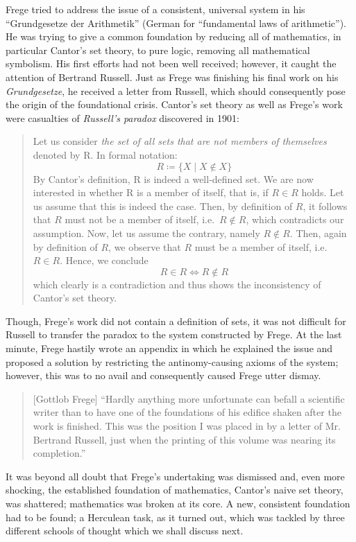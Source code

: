 \documentclass[hidelinks]{article}
\begin{document}
Frege tried to address the issue of a consistent, universal system in his ``Grundgesetze der Arithmetik'' (German for ``fundamental laws of arithmetic''). He was trying to give a common foundation by reducing all of mathematics, in particular Cantor's set theory, to pure logic, removing all mathematical symbolism. His first efforts had not been well received; however, it caught the attention of Bertrand Russell. Just as Frege was finishing his final work on his \textit{Grundgesetze}, he received a letter from Russell, which should consequently pose the origin of the foundational crisis. Cantor's set theory as well as Frege's work were casualties of \textit{Russell's paradox} discovered in 1901:
\begin{quote}
Let us consider \textit{the set of all sets that are not members of themselves} denoted by R. In formal notation:
\begin{equation*}
	R\coloneqq\{X\mid X\notin X\}
\end{equation*}
By Cantor's definition, R is indeed a well-defined set.
We are now interested in whether R is a member of itself, that is, if $R\in R$ holds.
Let us assume that this is indeed the case. Then, by definition of $R$, it follows that $R$ must not be a member of itself, i.e.\ $R\notin R$, which contradicts our assumption. Now, let us assume the contrary, namely $R\notin R$. Then, again by definition of $R$, we observe that $R$ must be a member of itself, i.e.\ $R\in R$. Hence, we conclude
\begin{equation*}
		R\in R\iff R\notin R
\end{equation*}
which clearly is a contradiction and thus shows the inconsistency of Cantor's set theory.
\end{quote}
Though, Frege's work did not contain a definition of sets, it was not difficult for Russell to transfer the paradox to the system constructed by Frege. At the last minute, Frege hastily wrote an appendix in which he explained the issue and proposed a solution by restricting the antinomy-causing axioms of the system; however, this was to no avail and consequently caused Frege utter dismay.
\begin{quote}[Gottlob Frege]
``Hardly anything more unfortunate can befall a scientific writer than to have one of the foundations of his edifice shaken after the work is finished. This was the position I was placed in by a letter of Mr. Bertrand Russell, just when the printing of this volume was nearing its completion.''\cite{frege_appendix}
\end{quote}
It was beyond all doubt that Frege's undertaking was dismissed and, even more shocking, the established foundation of mathematics, Cantor's naive set theory, was shattered; mathematics was broken at its core. A new, consistent foundation had to be found; a Herculean task, as it turned out, which was tackled by three different schools of thought which we shall discuss next.
\end{document}
